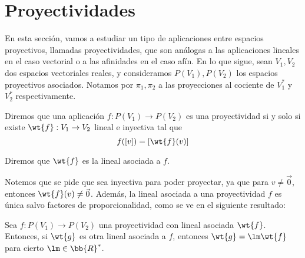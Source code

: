 \section{Proyectividades}

En esta sección, vamos a estudiar un tipo de aplicaciones entre espacios proyectivos, llamadas proyectividades, que son análogas a las aplicaciones lineales en el caso vectorial o a las afinidades en el caso afín.
En lo que sigue, sean $V_1,V_2$ dos espacios vectoriales reales, y consideramos $P(V_1),P(V_2)$ los espacios proyectivos asociados.
Notamos por $\pi_1,\pi_2$ a las proyecciones al cociente de $V_1^\ast$ y $V_2^\ast$ respectivamente.

\begin{definicion}[Proyectividad]
    Diremos que una aplicación $f:P(V_1)\to P(V_2)$ es una proyectividad si y solo si existe $\wt{f}:V_1\to V_2$ lineal e inyectiva tal que
    \begin{equation*}
        f([v])=\left[\wt{f}(v)\right]
    \end{equation*}

    Diremos que $\wt{f}$ es la lineal asociada a $f$.

    \begin{figure}[H]
        \centering
    \end{figure}
\end{definicion}
Notemos que se pide que sea inyectiva para poder proyectar, ya que para $v\neq \vec{0}$, entonces $\wt{f}(v)\neq \vec{0}$.
Además, la lineal asociada a una proyectividad $f$ es única salvo factores de proporcionalidad, como se ve en el siguiente resultado:
\begin{prop}
    Sea $f:P(V_1)\to P(V_2)$ una proyectividad con lineal asociada $\wt{f}$.
    Entonces, si $\wt{g}$ es otra lineal asociada a $f$, entonces $\wt{g}=\lm \wt{f}$ para cierto $\lm \in \bb{R}^\ast$.
\end{prop}
